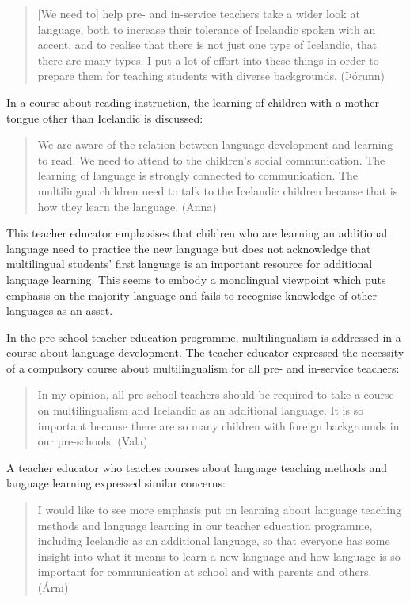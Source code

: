 \documentclass[output=paper]{langscibook}
\begin{document}
\begin{quote}
[We need to] help pre- and in-service teachers take a wider look at language, both to increase their tolerance of Icelandic spoken with an accent, and to realise that there is not just one type of Icelandic, that there are many types. I put a lot of effort into these things in order to prepare them for teaching students with diverse backgrounds. (Þórunn)
\end{quote}

In a course about reading instruction, the learning of children with a mother tongue other than Icelandic is discussed: 

\begin{quote}
We are aware of the relation between language development and learning to read. We need to attend to the children’s social communication. The learning of language is strongly connected to communication. The multilingual children need to talk to the Icelandic children because that is how they learn the language. (Anna)
\end{quote}

This teacher educator emphasises that children who are learning an additional language need to practice the new language but does not acknowledge that multilingual students’ first language is an important resource for additional language learning. This seems to embody a monolingual viewpoint which puts emphasis on the majority language and fails to recognise knowledge of other languages as an asset.  

In the pre-school teacher education programme, multilingualism is addressed in a course about language development. The teacher educator expressed the necessity of a compulsory course about multilingualism for all pre- and in-service teachers:

\begin{quote}
In my opinion, all pre-school teachers should be required to take a course on multilingualism and Icelandic as an additional language. It is so important because there are so many children with foreign backgrounds in our pre-schools. (Vala)
\end{quote}

A teacher educator who teaches courses about language teaching methods and language learning expressed similar concerns:

\begin{quote}
I would like to see more emphasis put on learning about language teaching methods and language learning in our teacher education programme, including Icelandic as an additional language, so that everyone has some insight into what it means to learn a new language and how language is so important for communication at school and with parents and others. (Árni)
\end{quote}
\end{document}
